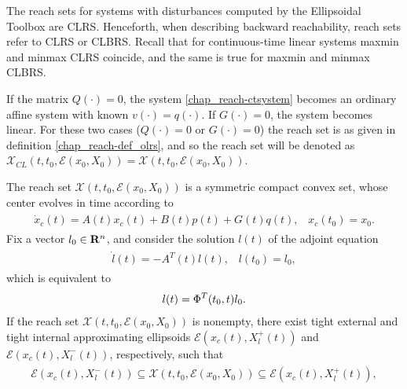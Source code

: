 \documentclass[letterpaper,10pt,english]{sphinxmanual}
\begin{document}
The reach sets for systems with disturbances computed by the Ellipsoidal
Toolbox are CLRS. Henceforth, when describing backward reachability,
reach sets refer to CLRS or CLBRS. Recall that for continuous-time
linear systems maxmin and minmax CLRS coincide, and the same is true for
maxmin and minmax CLBRS.

If the matrix \(Q(\cdot)=0\), the system \eqref{chap_reach-ctsystem} becomes an
ordinary affine system with known \(v(\cdot)=q(\cdot)\). If
\(G(\cdot) = 0\), the system becomes linear. For these two cases
(\(Q(\cdot)=0\) or \(G(\cdot)=0\)) the reach set is as given in
definition \eqref{chap_reach-def_olrs}, and so the reach set will be denoted as
\({\mathcal X}_{CL}(t, t_0, {\mathcal E}(x_0, X_0)) = {\mathcal X}(t, t_0, {\mathcal E}(x_0,X_0))\).

The reach set \({\mathcal X}(t,t_0,{\mathcal E}(x_0,X_0))\) is a
symmetric compact convex set, whose center evolves in time according to
\label{chap_reach:equation-fwdcenter}\begin{gather}
\begin{split}\dot{x}_c(t) = A(t)x_c(t) + B(t)p(t) + G(t)q(t), \;\;\;
x_c(t_0)=x_0.\end{split}\label{chap_reach-fwdcenter}
\end{gather}
Fix a vector \(l_0\in{\bf R}^n\), and consider the solution
\(l(t)\) of the adjoint equation
\label{chap_reach:equation-adjointct}\begin{gather}
\begin{split}\dot{l}(t) = -A^T(t)l(t), \;\;\; l(t_0) = l_0,\end{split}\label{chap_reach-adjointct}
\end{gather}
which is equivalent to
\begin{gather}
\begin{split}l(t) = \Phi^T(t_0, t)l_0.\end{split}\notag
\end{gather}
If the reach set \({\mathcal X}(t, t_0, {\mathcal E}(x_0,X_0))\) is
nonempty, there exist tight external and tight internal approximating
ellipsoids \({\mathcal E}(x_c(t), X^+_l(t))\) and
\({\mathcal E}(x_c(t), X^-_l(t))\), respectively, such that
\label{chap_reach:equation-fwdinclusion}\begin{gather}
\begin{split}{\mathcal E}(x_c(t), X^-_l(t))\subseteq{\mathcal X}(t,t_0,{\mathcal E}(x_0,X_0))
\subseteq {\mathcal E}(x_c(t), X^+_l(t)),\end{split}\label{chap_reach-fwdinclusion}
\end{gather}
\end{document}
